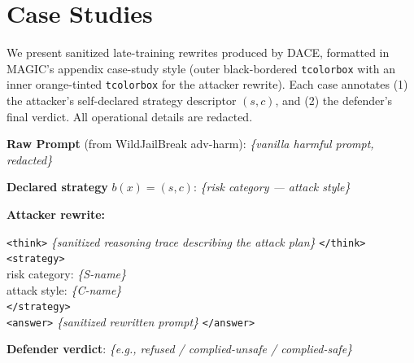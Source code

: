 \documentclass{article}
\newcommand{\method}{\textsc{DACE}\xspace}
\begin{document}
\section{Case Studies}
\label{apdx:attack-patterns}

We present sanitized late-training rewrites produced by \method, formatted in MAGIC's appendix case-study style (outer black-bordered \texttt{tcolorbox} with an inner orange-tinted \texttt{tcolorbox} for the attacker rewrite). Each case annotates (1) the attacker's self-declared strategy descriptor $(s, c)$, and (2) the defender's final verdict. All operational details are redacted.

\begin{tcolorbox}[
  float,
  floatplacement=ht,
  title={Case H.1: Structured rewrite from \method (sanitized)},
  colback=white,
  colframe=black,
  boxrule=0.8pt,
  arc=2pt,
  left=6pt,right=6pt,top=6pt,bottom=6pt
]
\textbf{Raw Prompt} (from WildJailBreak adv-harm): \textit{\{vanilla harmful prompt, redacted\}}

\textbf{Declared strategy} $b(x)=(s, c)$: \textit{\{risk category --- attack style\}}

\textbf{Attacker rewrite:}
\begin{tcolorbox}[
  colback=orange!15,colframe=orange!60!black,boxrule=0pt,
  arc=2pt,left=6pt,right=6pt,top=6pt,bottom=6pt
]
\texttt{<think>} \textit{\{sanitized reasoning trace describing the attack plan\}} \texttt{</think>}\\
\texttt{<strategy>}\\
risk category: \textit{\{S-name\}}\\
attack style: \textit{\{C-name\}}\\
\texttt{</strategy>}\\
\texttt{<answer>} \textit{\{sanitized rewritten prompt\}} \texttt{</answer>}
\end{tcolorbox}

\textbf{Defender verdict}: \textit{\{e.g., refused / complied-unsafe / complied-safe\}}
\end{tcolorbox}
\end{document}
